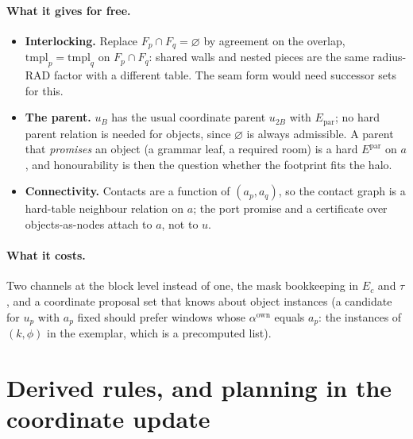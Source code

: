 \documentclass[11pt]{article}
\newcommand{\1}{\mathds{1}}
\begin{document}
\paragraph{What it gives for free.}
\begin{itemize}
  \item \textbf{Interlocking.} Replace $F_p \cap F_q = \varnothing$ by agreement on the
        overlap, $\mathrm{tmpl}_p = \mathrm{tmpl}_q$ on $F_p \cap F_q$: shared walls and
        nested pieces are the same radius-$\mathrm{RAD}$ factor with a different
        table. The seam form would need successor sets for this.
  \item \textbf{The parent.} $u_B$ has the usual coordinate parent $u_{2B}$ with
        $E_{\mathrm{par}}$; no hard parent relation is needed for objects, since
        $\varnothing$ is always admissible. A parent that \emph{promises} an object
        (a grammar leaf, a required room) is a hard $E^{\mathrm{par}}$ on $a$, and
        honourability is then the question whether the footprint fits the halo.
  \item \textbf{Connectivity.} Contacts are a function of $(a_p, a_q)$, so the
        contact graph is a hard-table neighbour relation on $a$; the port promise
        and a certificate over objects-as-nodes attach to $a$, not to $u$.
\end{itemize}

\paragraph{What it costs.} Two channels at the block level instead of one, the
mask bookkeeping in $E_c$ and $\tau$, and a coordinate proposal set that knows
about object instances (a candidate for $u_p$ with $a_p$ fixed should prefer
windows whose $\alpha^{\mathrm{own}}$ equals $a_p$: the instances of $(k, \phi)$ in
the exemplar, which is a precomputed list).

\section{Derived rules, and planning in the coordinate update}
\label{sec:plan}
\end{document}

